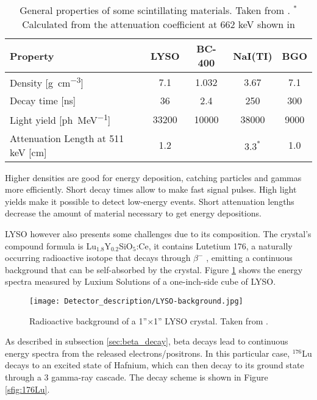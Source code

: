\begin{table}[H]
  \caption{General properties of some scintillating materials. Taken from \cite{mukhopadhyay2004plastic,Luxium_LYSO,Luxium_plastic,SaintGobain_NaI}. $^*$Calculated from the attenuation coefficient at 662 \unit{\kilo\eV} shown in \cite[p.~3]{SaintGobain_NaI}}
  \centering
  \begin{tabular}{ l c c c c}
    \midrule
    Property & LYSO & BC-400 & NaI(TI) & BGO\\
    \midrule
    Density [\unit{\g\per\cm\cubed}] & 7.1 & 1.032 & 3.67 & 7.1\\
    Decay time [\unit{\nano\s}]  & 36 & 2.4 & 250 & 300\\
    Light yield [\unit{ph\per\mega\eV}] & 33200 & 10000 & 38000 & 9000\\
    Attenuation Length at 511 \unit{\kilo\eV} [\unit{\cm}] & 1.2 &  & $3.3^{*}$ & 1.0\\
    \bottomrule
  \end{tabular}
  \label{tab:scintillators}
\end{table}

Higher densities are good for energy deposition, catching particles and gammas more efficiently. Short decay times allow to make fast signal pulses. High light yields make it possible to detect low-energy events. Short attenuation lengths decrease the amount of material necessary to get energy depositions.

LYSO however also presents some challenges due to its composition. The crystal's compound formula is Lu$_{1.8}$Y$_{0.2}$SiO$_5$:Ce, it contains Lutetium 176, a naturally occurring radioactive isotope that decays through $\beta^-$ \cite{Luxium_LYSO}, emitting a continuous background that can be self-absorbed by the crystal. Figure \ref{fig:LYSO_background} shows the energy spectra measured by Luxium Solutions of a one-inch-side cube of LYSO.

\begin{figure}[H]
  \centering
  \texttt{[image: Detector\_description/LYSO-background.jpg]}
  \caption{Radioactive background of a 1''$\times$1'' LYSO crystal. Taken from \cite{Luxium_LYSO}.}
  \label{fig:LYSO_background}
\end{figure}

As described in subsection \ref{sec:beta_decay}, beta decays lead to continuous energy spectra from the released electrons/positrons. In this particular case, $^{176}$Lu decays to an excited state of Hafnium, which can then decay to its ground state through a 3 gamma-ray cascade. The decay scheme is shown in Figure \ref{sfig:176Lu}.

